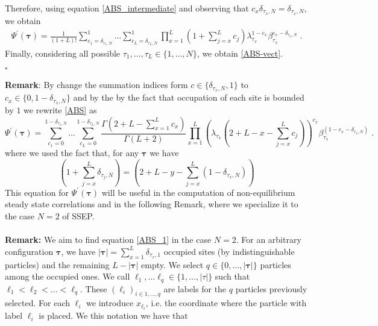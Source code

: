 \documentclass[10pt]{article}
\numberwithin{equation}{section}
\numberwithin{equation}{subsection}
\newcommand{\dt}{\;.}
\begin{document}
Therefore, using equation \eqref{ABS_intermediate} and observing that $c_{x}\delta_{\tau_{x},N} =\delta_{\tau_{x},N}$, we obtain 
\begin{equation}\label{elementsABS}
	\begin{split}
		\Psi^{'}(\bm{\tau})=\frac{1}{(1+L)!}\sum_{c_{1}=\delta_{\tau_{1},N}}^{1}\ldots\sum_{c_{L}=\delta_{\tau_{L},N}}^{1}\prod_{x=1}^{L}\left(1+\sum_{j=x}^{L}c_{j}\right)\lambda_{\tau_{x}}^{1-c_{x}}\beta_{\tau_{x}}^{c_{x}-\delta_{\tau_{x},N}}\dt
	\end{split}
\end{equation} 
Finally, considering all possible $\tau_{1},\ldots,\tau_{L}\in \{1,\ldots,N\}$, we obtain \eqref{ABS-vect}.
\begin{flushright}
    $\square$
\end{flushright}
\textbf{Remark}: By change the summation indices form $c\in \{\delta_{\tau_{x},N},1\}$ to $c_{x}\in \{0,1-\delta_{\tau_{x},N}\}$ and by the by the fact that occupation of each site is bounded by $1$ we rewrite \eqref{ABS} as 
\begin{equation}\label{ABS_1}
	\Psi^{'}(\bm{\tau})=\sum_{c_{1}=0}^{1-\delta_{\tau_{1},N}}\ldots\sum_{c_{L}=0}^{1-\delta_{\tau_{L},N}}\frac{\Gamma(2+L-\sum_{x=1}^{L}c_{x})}{\Gamma(L+2)}\prod_{x=1}^{L}\left(\lambda_{\tau_{x}}\left(2+L-x-\sum_{j=x}^{L}c_{j}\right)\right)^{c_{x}}\beta_{\tau_{x}}^{(1-c_{x}-\delta_{\tau_{x},N})}\dt
\end{equation}
where we used the fact that, for any $\bm{\tau}$ we have 
\begin{equation}
	\left(1+\sum_{j=x}^{L}\delta_{\tau_{j},N}\right) =\left(2+L-y-\sum_{j=x}^{L}(1-\delta_{\tau_{x},N})\right)
\end{equation}
This equation for $\Psi^{'}(\bm{\tau})$ will be useful in the computation of non-equilibrium steady state correlations and in the following Remark, where we specialize it to the case $N=2$ of SSEP. \\ \\
\textbf{Remark:}  We aim to find equation \eqref{ABS_1} in the case $N=2$. For an arbitrary configuration $\bm{\tau}$, we have $|\bm{\tau}|=\sum_{x=1}^{L}\delta_{\tau_{x},1}$ occupied sites (by indistinguishable particles) and the remaining $L-|\bm{\tau}|$ empty. We select $q\in\{0,\ldots,|\bm{\tau}|\}$ particles among the occupied ones. We call $\ell_{1},\ldots\ell_{q}\in \{1,\ldots,|\tau|\}$ such that $\ell_{1}<\ell_{2}<\ldots<\ell_{q}$. These $(\ell_{i})_{i\in {1,\ldots,q}}$ are labels for the $q$ particles previously selected. For each $\ell_{i}$ we introduce $x_{\ell_{i}}$, i.e. the coordinate where the particle with label $\ell_{i}$ is placed. We this notation we have that 
\end{document}
